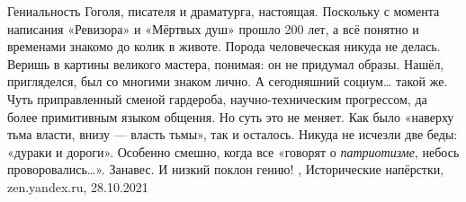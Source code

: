 Гениальность Гоголя, писателя и драматурга, настоящая. Поскольку с момента
написания «Ревизора» и «Мёртвых душ» прошло 200 лет, а всё понятно и временами
знакомо до колик в животе. Порода человеческая никуда не делась. Веришь в
картины великого мастера, понимая: он не придумал образы. Нашёл, пригляделся,
был со многими знаком лично. А сегодняшний социум… такой же. Чуть приправленный
сменой гардероба, научно-техническим прогрессом, да более примитивным языком
общения.  Но суть это не меняет. Как было «наверху тьма власти, внизу — власть
тьмы», так и осталось. Никуда не исчезли две беды: «дураки и дороги». Особенно
смешно, когда все «говорят о \emph{патриотизме}, небось проворовались…».
Занавес. И низкий поклон гению!
, 
Исторические напёрстки, zen.yandex.ru, 28.10.2021
